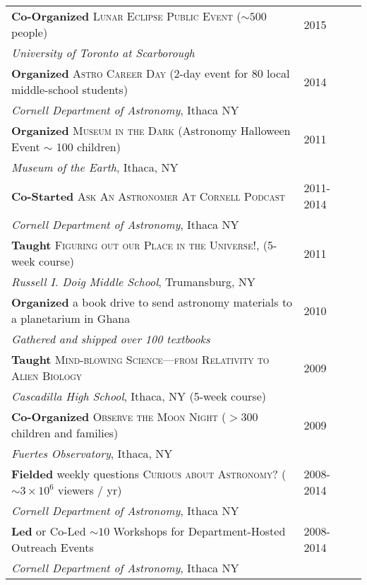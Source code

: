 \documentclass[10pt]{article} %
\begin{document}
\begin{tabular}{l>{\hfill}p{2.7cm}r}
{\bf Co-Organized} \textsc{Lunar Eclipse Public Event} ($\sim 500$ people) & 2015\\
{\it University of Toronto at Scarborough} \\
{\bf Organized} \textsc{Astro Career Day} (2-day event for 80 local middle-school students) & 2014\\
{\it Cornell Department of Astronomy}, Ithaca NY \\
{\bf Organized} \textsc{Museum in the Dark} (Astronomy Halloween Event $\sim$ 100 children) & 2011\\
{\it Museum of the Earth}, Ithaca, NY \\
{\bf Co-Started} \textsc{Ask An Astronomer At Cornell Podcast} & 2011-2014\\
{\it Cornell Department of Astronomy}, Ithaca NY  \\
{\bf Taught} \textsc{Figuring out our Place in the Universe!}, (5-week course) & 2011\\ 
{\it Russell I. Doig Middle School}, Trumansburg, NY \\
{\bf Organized} a book drive to send astronomy materials to a planetarium in Ghana & 2010\\
{\it Gathered and shipped over 100 textbooks} \\
{\bf Taught} \textsc{Mind-blowing Science---from Relativity to Alien Biology} & 2009\\
{\it Cascadilla High School}, Ithaca, NY (5-week course) \\
{\bf Co-Organized} \textsc{Observe the Moon Night} ($> 300$ children and families) & 2009\\
{\it Fuertes Observatory}, Ithaca, NY \\
{\bf Fielded} weekly questions \textsc{Curious about Astronomy?}  ($\sim 3\times10^6$ viewers / yr) & 2008-2014\\
{\it Cornell Department of Astronomy}, Ithaca NY \\
{\bf Led} or Co-Led $\sim 10$ Workshops for Department-Hosted Outreach Events & 2008-2014 \\
{\it Cornell Department of Astronomy}, Ithaca NY
\end{tabular}
\end{document}
